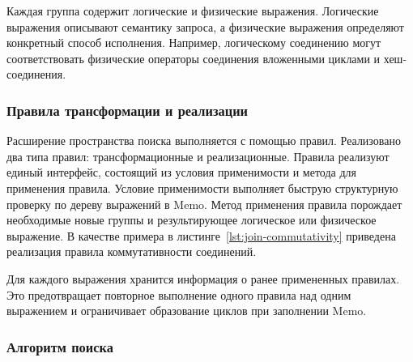 \documentclass[14pt, russian]{scrartcl}
\begin{document}
Каждая группа содержит логические и физические выражения. Логические выражения
описывают семантику запроса, а физические выражения определяют конкретный способ
исполнения. Например, логическому соединению могут соответствовать физические
операторы соединения вложенными циклами и хеш-соединения.

\subsubsection{Правила трансформации и реализации}

Расширение пространства поиска выполняется с помощью правил. Реализовано два
типа правил: трансформационные и реализационные. %
Правила реализуют единый интерфейс, состоящий из условия применимости и метода
для применения правила. Условие применимости выполняет быструю структурную
проверку по дереву выражений в Memo. Метод применения правила порождает
необходимые новые группы и результирующее логическое или физическое выражение. В
качестве примера в листинге~\ref{lst:join-commutativity} приведена реализация
правила коммутативности соединений.


Для каждого выражения хранится информация о ранее примененных правилах. Это
предотвращает повторное выполнение одного правила над одним выражением и
ограничивает образование циклов при заполнении Memo.

\subsubsection{Алгоритм поиска}
\end{document}
